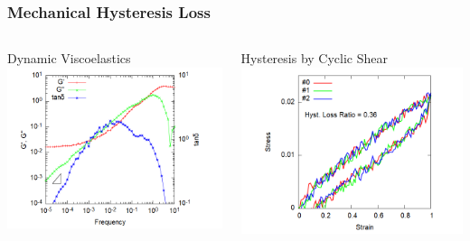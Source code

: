 \documentclass[12pt, dvipdfmx]{beamer}
\begin{document}
\begin{frame}
	\frametitle{Mechanical Hysteresis Loss}
	\vspace{-2mm}
	\begin{columns}[c, onlytextwidth]
			\begin{exampleblock}{Dynamic Viscoelastics}
				\centering
					\includegraphics[width=\textwidth]{gw_4chain_N50_stepstretch.png}
			\end{exampleblock}
			\begin{alertblock}{Hysteresis by Cyclic Shear}
				\centering
					\includegraphics[width=\textwidth]{CyclicDeform_4chain_N50_rate5e-5.png}
			\end{alertblock}
	\end{columns}


\end{frame}
\end{document}
